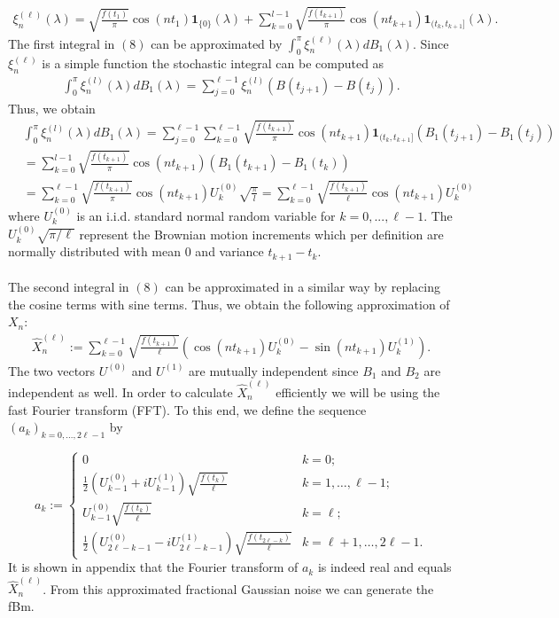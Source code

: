 \documentclass{article}
\begin{document}
\begin{align}
\xi_n^{(\ell)}(\lambda)= \sqrt{\frac{f(t_1)}{\pi}}\cos(nt_1)\mathbf{1}_{\{0\}}(\lambda)+\sum_{k=0}^{l-1} \sqrt{\frac{f(t_{k+1})}{\pi}}\cos(nt_{k+1})\mathbf{1}_{(t_k,t_{k+1}]}(\lambda).
\end{align}
The first integral in $(8)$ can be approximated by $\int_0^\pi \xi_n^{(\ell)}(\lambda)dB_1(\lambda)$. Since $\xi_n^{(\ell)}$ is a simple function the stochastic integral can be computed as
\begin{align}
\int_0^\pi \xi_n^{(l)}(\lambda)dB_1(\lambda) = \sum _{j=0}^{\ell-1} \xi_n^{(l)} (B(t_{j+1})-B(t_j)).
\end{align} 
Thus, we obtain 
\begin{align*}
&\int_0^\pi \xi_n^{(l)}(\lambda)dB_1(\lambda) = \sum_{j=0}^{\ell-1}\sum_{k=0}^{\ell-1} \sqrt{\frac{f(t_{k+1})}{\pi}} \cos(n t_{k+1}) \mathbf{1}_{(t_k,t_{k+1}]}(B_1(t_{j+1})-B_1(t_j))\\
&= \sum_{k=0}^{l-1} \sqrt{\frac{f(t_{k+1})}{\pi}} \cos(n t_{k+1}) 
(B_1(t_{k+1})-B_1(t_k)) \\
&= \sum_{k=0}^{\ell-1} \sqrt{\frac{f(t_{k+1})}{\pi}} \cos(n t_{k+1})U_k^{(0)} \sqrt{\frac{\pi}{l}} = \sum_{k=0}^{\ell-1} \sqrt{\frac{f(t_{k+1})}{\ell}} \cos(n t_{k+1})U_k^{(0)}
\end{align*}
where $U_k^{(0)}$ is an i.i.d. standard normal random variable for $k=0,...,\ell-1$. The $U_k^{(0)}\sqrt{\pi/\ell}$ represent the Brownian motion increments which per definition are normally distributed with mean $0$ and variance $t_{k+1}-t_k$.\\\\
The second integral in $(8)$ can be approximated in a similar way by replacing the cosine terms with sine terms. Thus, we obtain the following approximation of $X_n$:
\begin{align}
\hat{X}_n^{(\ell)} := \sum_{k=0}^{\ell-1} \sqrt{\frac{f(t_{k+1})}{\ell}}\left( \cos(nt_{k+1})U_k^{(0)}-\sin (nt_{k+1}) U_k^{(1)}\right).
\end{align}
The two vectors $U^{(0)}$ and $U^{(1)}$ are mutually independent since $B_1$ and $B_2$ are independent as well. In order to calculate $\hat{X}_n^{(\ell)}$ efficiently we will be using the fast Fourier transform (FFT). To this end, we define the sequence $(a_k)_{k=0,...,2\ell-1}$ by

\[
a_k := \begin{cases}
0 & k = 0; \\
\frac{1}{2} \left( U^{(0)}_{k-1} + i U^{(1)}_{k-1} \right) \sqrt{\frac{f(t_k)}{\ell}} & k = 1, \dots, \ell - 1; \\
U^{(0)}_{k-1} \sqrt{\frac{f(t_k)}{\ell}} & k = \ell; \\
\frac{1}{2} \left( U^{(0)}_{2\ell - k - 1} - i U^{(1)}_{2\ell - k - 1} \right) \sqrt{\frac{f(t_{2\ell - k})}{\ell}} & k = \ell + 1, \dots, 2\ell - 1.
\end{cases}
\]
It is shown in appendix that the Fourier transform of $a_k$ is indeed real and equals $\hat{X}_n^{(\ell)}$. From this approximated fractional Gaussian noise we can generate the fBm. \\
\end{document}
